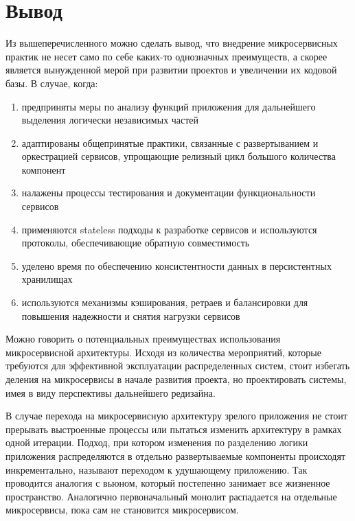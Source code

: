 \section{Вывод}
Из вышеперечисленного можно сделать вывод, что внедрение микросервисных практик не несет само по себе
каких-то однозначных преимуществ, а скорее является вынужденной мерой при развитии проектов и увеличении их кодовой базы.
В случае, когда:
\begin{enumerate}
    \item предприняты меры по анализу функций приложения для дальнейшего выделения
    логически независимых частей
    \item адаптированы общепринятые практики, связанные с развертыванием и оркестрацией сервисов, упрощающие 
    релизный цикл большого количества компонент
    \item налажены процессы тестирования и документации функциональности сервисов
    \item применяются stateless подходы к разработке сервисов и используются протоколы, обеспечивающие обратную совместимость
    \item уделено время по обеспечению консистентности данных в персистентных хранилищах
    \item используются механизмы кэширования, ретраев и балансировки для повышения надежности и снятия нагрузки сервисов
\end{enumerate}
Можно говорить о потенциальных преимуществах использования микросервисной архитектуры.
Исходя из количества мероприятий, которые требуются для эффективной эксплуатации распределенных систем,
стоит избегать деления на микросервисы в начале развития проекта, но проектировать системы,
имея в виду перспективы дальнейшего редизайна.

В случае перехода на микросервисную архитектуру зрелого приложения не стоит прерывать выстроенные процессы или пытаться
изменить архитектуру в рамках одной итерации. Подход, при котором изменения по разделению логики приложения распределяются
в отдельно развертываемые компоненты происходят инкрементально, называют переходом к удушающему приложению. Так проводится аналогия
с вьюном, который постепенно занимает все жизненное пространство. Аналогично первоначальный монолит распадается на отдельные микросервисы, пока
сам не становится микросервисом.